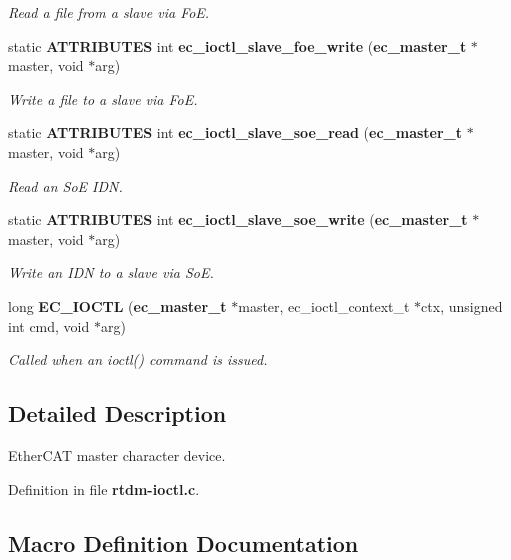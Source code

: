 \begin{DoxyCompactItemize}
\begin{DoxyCompactList}\small\item\em Read a file from a slave via Fo\-E. \end{DoxyCompactList}\item 
static {\bf A\-T\-T\-R\-I\-B\-U\-T\-E\-S} int {\bf ec\-\_\-ioctl\-\_\-slave\-\_\-foe\-\_\-write} ({\bf ec\-\_\-master\-\_\-t} $\ast$master, void $\ast$arg)
\begin{DoxyCompactList}\small\item\em Write a file to a slave via Fo\-E. \end{DoxyCompactList}\item 
static {\bf A\-T\-T\-R\-I\-B\-U\-T\-E\-S} int {\bf ec\-\_\-ioctl\-\_\-slave\-\_\-soe\-\_\-read} ({\bf ec\-\_\-master\-\_\-t} $\ast$master, void $\ast$arg)
\begin{DoxyCompactList}\small\item\em Read an So\-E I\-D\-N. \end{DoxyCompactList}\item 
static {\bf A\-T\-T\-R\-I\-B\-U\-T\-E\-S} int {\bf ec\-\_\-ioctl\-\_\-slave\-\_\-soe\-\_\-write} ({\bf ec\-\_\-master\-\_\-t} $\ast$master, void $\ast$arg)
\begin{DoxyCompactList}\small\item\em Write an I\-D\-N to a slave via So\-E. \end{DoxyCompactList}\item 
long {\bf E\-C\-\_\-\-I\-O\-C\-T\-L} ({\bf ec\-\_\-master\-\_\-t} $\ast$master, ec\-\_\-ioctl\-\_\-context\-\_\-t $\ast$ctx, unsigned int cmd, void $\ast$arg)
\begin{DoxyCompactList}\small\item\em Called when an ioctl() command is issued. \end{DoxyCompactList}\end{DoxyCompactItemize}


\subsection{Detailed Description}
Ether\-C\-A\-T master character device. 

Definition in file {\bf rtdm-\/ioctl.\-c}.



\subsection{Macro Definition Documentation}
